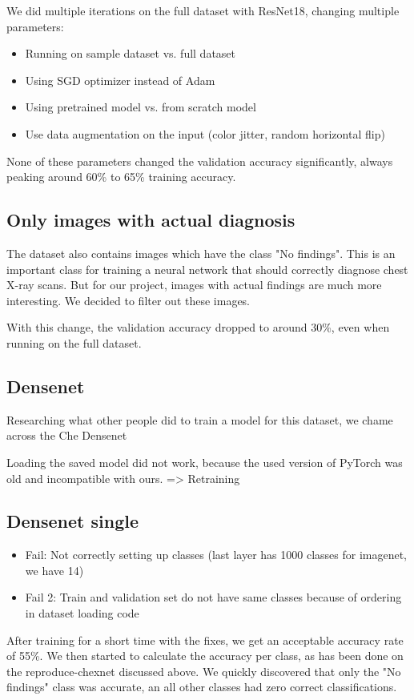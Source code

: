 We did multiple iterations on the full dataset with ResNet18, changing multiple parameters:
\begin{itemize}
    \item Running on sample dataset vs. full dataset
    \item Using SGD optimizer instead of Adam
    \item Using pretrained model vs. from scratch model
    \item Use data augmentation on the input (color jitter, random horizontal flip)
\end{itemize}

None of these parameters changed the validation accuracy significantly, always peaking around 60\% to 65\% training accuracy.

\subsection{Only images with actual diagnosis}
The dataset also contains images which have the class "No findings". This is an important class for training a neural network that should correctly diagnose chest X-ray scans. But for our project, images with actual findings are much more interesting. We decided to filter out these images.

With this change, the validation accuracy dropped to around 30\%, even when running on the full dataset.

\subsection{Densenet}

Researching what other people did to train a model for this dataset, we chame across the Che
Densenet


Loading the saved model did not work, because the used version of PyTorch was old and incompatible with ours.
=> Retraining

\subsection{Densenet single}

\begin{itemize}
    \item Fail: Not correctly setting up classes (last layer has 1000 classes for imagenet, we have 14)
    \item Fail 2: Train and validation set do not have same classes because of ordering in dataset loading code
\end{itemize}

After training for a short time with the fixes, we get an acceptable accuracy rate of 55\%. We then started to calculate the accuracy per class, as has been done on the reproduce-chexnet discussed above. We quickly discovered that only the "No findings" class was accurate, an all other classes had zero correct classifications.
